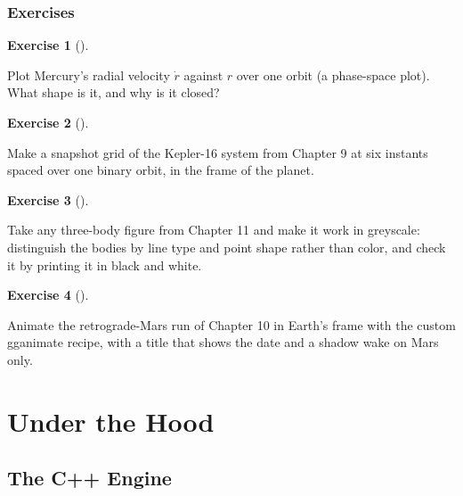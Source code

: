 \documentclass[
  10.5pt,
  letterpaper,
]{scrbook}
\theoremstyle{definition}
\newtheorem{exercise}{Exercise}[chapter]
\theoremstyle{plain}
\theoremstyle{remark}
\begin{document}
\section*{Exercises}\label{exercises-13}


\begin{exercise}[]\protect\hypertarget{exr-ch14-phase}{}\label{exr-ch14-phase}

Plot Mercury's radial velocity \(\dot r\) against \(r\) over one orbit
(a phase-space plot). What shape is it, and why is it closed?

\end{exercise}

\begin{exercise}[]\protect\hypertarget{exr-ch14-grid}{}\label{exr-ch14-grid}

Make a snapshot grid of the Kepler-16 system from Chapter 9 at six
instants spaced over one binary orbit, in the frame of the planet.

\end{exercise}

\begin{exercise}[]\protect\hypertarget{exr-ch14-greyscale}{}\label{exr-ch14-greyscale}

Take any three-body figure from Chapter 11 and make it work in
greyscale: distinguish the bodies by line type and point shape rather
than color, and check it by printing it in black and white.

\end{exercise}

\begin{exercise}[]\protect\hypertarget{exr-ch14-anim}{}\label{exr-ch14-anim}

Animate the retrograde-Mars run of Chapter 10 in Earth's frame with the
custom gganimate recipe, with a title that shows the date and a shadow
wake on Mars only.

\end{exercise}

\part{Under the Hood}

\chapter{The C++ Engine}\label{sec-cpp}
\end{document}
